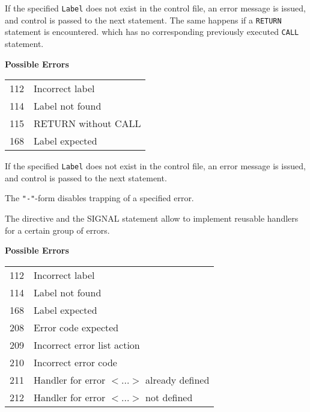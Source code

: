 If the specified \verb'Label' does not exist in the control
file, an error message is issued, and control is passed to the
next statement. The same happens if a \verb'RETURN' statement
is encountered. which has no corresponding previously executed
\verb'CALL' statement.

{\samepage
{\bf Possible Errors}
\begin{flushleft}
\begin{tabular}{ll}
112 & Incorrect label \\
114 & Label not found \\
115 & RETURN without CALL \\
168 & Label expected
\end{tabular}
\end{flushleft}
} %
{} %


If the specified \verb'Label' does not exist in the control
file, an error message is issued, and control is passed to the
next statement.

The \verb'"-"'-form disables trapping of a specified error.

The  directive and the SIGNAL statement
allow to implement reusable handlers for a certain group
of errors.

{\samepage
{\bf Possible Errors}
\begin{flushleft}
\begin{tabular}{ll}
112 & Incorrect label \\
114 & Label not found \\
168 & Label expected \\
208 & Error code expected \\
209 & Incorrect error list action \\
210 & Incorrect error code \\
211 & Handler for error $<$...$>$ already defined \\
212 & Handler for error $<$...$>$ not defined
\end{tabular}
\end{flushleft}
} %
{} %

